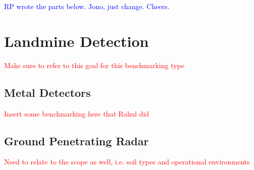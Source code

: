 \documentclass[main.tex]{subfiles}
\begin{document}
\textcolor{blue}{RP wrote the parts below. Jono, just change. Cheers. }
\section{Landmine Detection}
\textcolor{red}{Make sure to refer to this goal for this benchmarking type}


\subsection{Metal Detectors}
\textcolor{red}{Insert some benchmarking here that Rahul did}

\subsection{Ground Penetrating Radar}
\textcolor{red}{Need to relate to the scope as well, i.e. soil types and operational environments\\}

\end{document}
